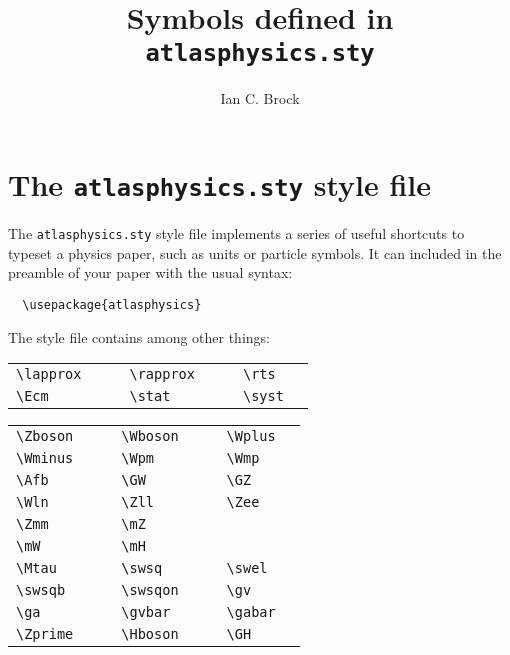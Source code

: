 \documentclass{../atlasnote}
\title{Symbols defined in \texttt{atlasphysics.sty}}
\author{Ian C. Brock}
\begin{document}
\section{The \texttt{atlasphysics.sty} style file}
\label{app:AtlasPhysicsSty}

The \texttt{atlasphysics.sty} style file implements a series of useful
shortcuts to typeset a physics paper, such as units or particle
symbols. It can included in the preamble of your paper with the usual
syntax:
%
\begin{verbatim}
  \usepackage{atlasphysics}
\end{verbatim}
%
The style file contains among other things:

\medskip

\begin{tabular}{llcllcll}
  \verb+\lapprox+ & \lapprox{} & \hspace{1cm} &
  \verb+\rapprox+ & \rapprox{}  &\hspace{1cm} &
  \verb+\rts+  & \rts{} \\
  \verb+\Ecm+ & \Ecm{} & &
  \verb+\stat+ & \stat{} & &
  \verb+\syst+ & \syst{} \\
\end{tabular}

\medskip

\begin{tabular}{llcllcll}
  \verb+\Zboson+ & \Zboson{} & \hspace{5mm} &
  \verb+\Wboson+ & \Wboson{} & \hspace{5mm} &
  \verb+\Wplus+ & \Wplus{} \\
  \verb+\Wminus+ & \Wminus{} & &
  \verb+\Wpm+ & \Wpm{} & &
  \verb+\Wmp+ & \Wmp{} \\
  \verb+\Afb+ & \Afb{} & &
  \verb+\GW+ & \GW{} & &
  \verb+\GZ+ & \GZ{} \\
  \verb+\Wln+ & \Wln{} & &
  \verb+\Zll+ & \Zll{} & &
  \verb+\Zee+ & \Zee{} \\
  \verb+\Zmm+ & \Zmm{} & &
  \verb+\mZ+ & \mZ{} \\
  \verb+\mW+ & \mW{} & &
  \verb+\mH+ & \mH{} \\
  \verb+\Mtau+ & \Mtau{} & &
  \verb+\swsq+ & \swsq{} & &
  \verb+\swel+ & \swel{} \\
  \verb+\swsqb+ &  \swsqb{} & &
  \verb+\swsqon+ & \swsqon{} & &
  \verb+\gv+ &  \gv{} \\
  \verb+\ga+ & \ga{} & &
  \verb+\gvbar+ & \gvbar{} & &
  \verb+\gabar+ & \gabar{} \\
  \verb+\Zprime+ & \Zprime{} & &
  \verb+\Hboson+ & \Hboson{} & & 
  \verb+\GH+ & \GH{} \\
\end{tabular}
\end{document}
